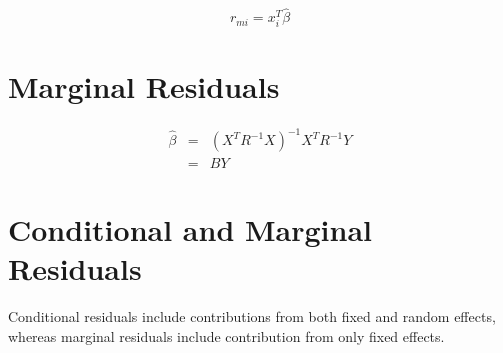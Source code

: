 \documentclass[12pt, a4paper]{report}
\theoremstyle{plain}
\theoremstyle{definition}
\theoremstyle{remark}
\begin{document}
	
	
	
	
	
	
	
	\begin{equation}
	r_{mi}=x^{T}_{i}\hat{\beta}
	\end{equation}
	
	\section{Marginal Residuals}
	\begin{eqnarray}
	\hat{\beta} &=& (X^{T}R^{-1}X)^{-1}X^{T}R^{-1}Y \nonumber \\
	&=& BY \nonumber
	\end{eqnarray}
	
	
	
	\section{Conditional and Marginal Residuals}
	Conditional residuals include contributions from both fixed and random effects, whereas marginal residuals include contribution from only fixed effects.
	
\end{document}
